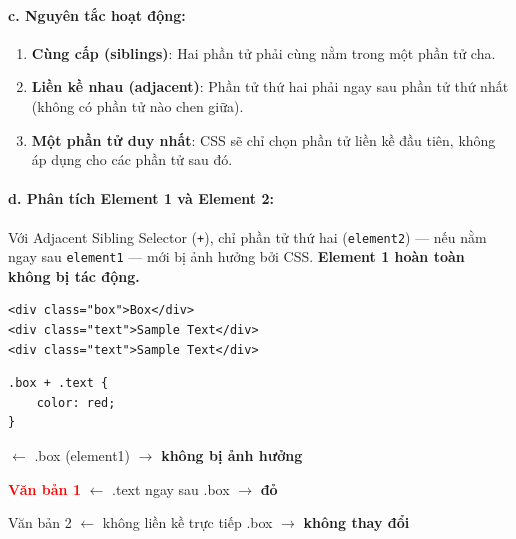 \documentclass[11pt,oneside]{book}
\newcommand{\codeinline}[1]{\textcolor{accentOrange}{\texttt{#1}}}
\begin{document}
\paragraph{c. Nguyên tắc hoạt động:}

\begin{noteBox}
\begin{enumerate}[leftmargin=1.5em, itemsep=3pt, parsep=0pt]
    \item \textbf{Cùng cấp (siblings)}: Hai phần tử phải cùng nằm trong một phần tử cha.
    \item \textbf{Liền kề nhau (adjacent)}: Phần tử thứ hai phải ngay sau phần tử thứ nhất (không có phần tử nào chen giữa).
    \item \textbf{Một phần tử duy nhất}: CSS sẽ chỉ chọn phần tử liền kề đầu tiên, không áp dụng cho các phần tử sau đó.
\end{enumerate}
\end{noteBox}

\paragraph{d. Phân tích Element 1 và Element 2:}
Với Adjacent Sibling Selector (\codeinline{+}), chỉ phần tử thứ hai (\codeinline{element2}) --- nếu nằm ngay sau \codeinline{element1} --- mới bị ảnh hưởng bởi CSS. \textbf{Element 1 hoàn toàn không bị tác động.}

\begin{codeWindow}
\begin{lstlisting}[language=HTML5]
<div class="box">Box</div>
<div class="text">Sample Text</div>
<div class="text">Sample Text</div>
\end{lstlisting}

\begin{lstlisting}[language=CSS3]
.box + .text {
    color: red;
}
\end{lstlisting}
\end{codeWindow}

\begin{browserWindow}
\sffamily\small
{} {\small\textcolor{gray!60}{$\leftarrow$ .box (element1) $\rightarrow$ \textbf{không bị ảnh hưởng}}} \par\vspace{4pt}
\textcolor{red}{\textbf{Văn bản 1}} {\small\textcolor{gray!60}{$\leftarrow$ .text ngay sau .box $\rightarrow$ \textbf{đỏ}}} \par\vspace{2pt}
\textcolor{darkText}{Văn bản 2} {\small\textcolor{gray!60}{$\leftarrow$ không liền kề trực tiếp .box $\rightarrow$ \textbf{không thay đổi}}} \par\vspace{4pt}
\end{browserWindow}
\end{document}

